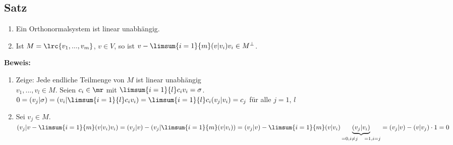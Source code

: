 \subsection{Satz}
	\begin{enumerate}
		\item Ein Orthonormalsystem ist linear unabhängig.
		\item Ist $ M=\lrc{v_1,...,v_m} $, $ v\in V $, so ist $ v-\limsum{i=1}{m}(v|v_i)v_i\in M^\perp $.
	\end{enumerate}

	\textbf{Beweis:}
	\begin{enumerate}
		\item Zeige: Jede endliche Teilmenge von $ M $ ist linear unabhängig\\
			$ v_1,...,v_l\in M $. Seien $ c_i\in\mr $ mit $ \limsum{i=1}{l}c_iv_i=\sigma $.\\
			$ 0=(v_j|\sigma)=(v_i|\limsum{i=1}{l}c_iv_i)=\limsum{i=1}{l}c_i(v_j|v_i)=c_j $ für alle $ j=1 $, $ l $
		\item Sei $ v_j\in M $. $ (v_j|v-\limsum{i=1}{m}(v|v_i)v_i)=(v_j|v)-(v_j|\limsum{i=1}{m}(v|v_i))=(v_j|v)-\limsum{i=1}{m}(v|v_i)\underbrace{(v_j|v_i)}_{=0, i\neq j \quad =1, i=j}=(v_j|v)-(v|v_j)\cdot 1=0 $
	\end{enumerate}

